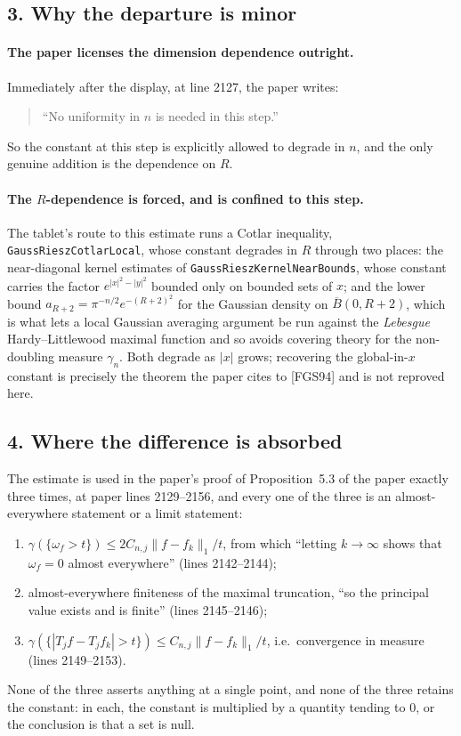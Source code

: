 \subsection*{3. Why the departure is minor}

\paragraph{The paper licenses the dimension dependence outright.}  Immediately
after the display, at line 2127, the paper writes:
\begin{quote}
``No uniformity in $n$ is needed in this step.''
\end{quote}
So the constant at this step is explicitly allowed to degrade in $n$, and the
only genuine addition is the dependence on $R$.

\paragraph{The $R$-dependence is forced, and is confined to this step.}  The
tablet's route to this estimate runs a Cotlar inequality,
\texttt{GaussRieszCotlarLocal}, whose constant degrades in $R$ through two
places: the near-diagonal kernel estimates of
\texttt{GaussRieszKernelNearBounds}, whose constant carries the factor
$e^{|x|^2-|y|^2}$ bounded only on bounded sets of $x$; and the lower bound
$a_{R+2} = \pi^{-n/2}e^{-(R+2)^2}$ for the Gaussian density on
$\overline B(0,R+2)$, which is what lets a local Gaussian averaging argument be
run against the \emph{Lebesgue} Hardy--Littlewood maximal function and so avoids
covering theory for the non-doubling measure $\gamma_n$.  Both degrade as
$|x|$ grows; recovering the global-in-$x$ constant is precisely the theorem the
paper cites to [FGS94] and is not reproved here.

\subsection*{4. Where the difference is absorbed}

The estimate is used in the paper's proof of Proposition~5.3 of the paper
exactly three times, at paper lines 2129--2156, and every one of the three is an
almost-everywhere statement or a limit statement:
\begin{enumerate}
\item $\gamma(\{\omega_f>t\}) \leq 2C_{n,j}\|f-f_k\|_1/t$, from which
``letting $k \to \infty$ shows that $\omega_f = 0$ almost everywhere''
(lines 2142--2144);
\item almost-everywhere finiteness of the maximal truncation, ``so the
principal value exists and is finite'' (lines 2145--2146);
\item $\gamma(\{|T_jf-T_jf_k|>t\}) \leq C_{n,j}\|f-f_k\|_1/t$, i.e.\
convergence in measure (lines 2149--2153).
\end{enumerate}
None of the three asserts anything at a single point, and none of the three
retains the constant: in each, the constant is multiplied by a quantity tending
to $0$, or the conclusion is that a set is null.

